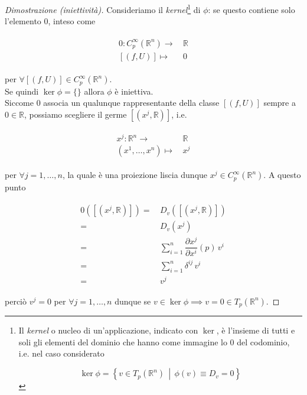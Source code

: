 \begin{proof}[Dimostrazione (iniettività)]
	Consideriamo il \textit{kernel}\footnote{%
	Il \textit{kernel} o nucleo di un'applicazione, indicato con $ \ker $, è l'insieme di tutti e soli gli elementi del dominio che hanno come immagine lo $ 0 $ del codominio, i.e. nel caso considerato
	
	\begin{equation}
		\ker \phi = \left\{ v \in T_{p}(\mathbb{R}^{n}) \, \middle| \, \phi(v) \equiv D_{v} = 0 \right\}
	\end{equation}%
	} di $ \phi $: se questo contiene solo l'elemento $ 0 $, inteso come
	
	\begin{align}
		\begin{split}
			0 : C_{p}^{\infty}(\mathbb{R}^{n}) \to& \, \mathbb{R}\\
			[(f,U)] \mapsto& \, 0
		\end{split}
	\end{align}

	per $ \forall [(f,U)] \in C_{p}^{\infty}(\mathbb{R}^{n}) $.\\
	Se quindi $ \ker \phi = \{\} $ allora $ \phi $ è iniettiva.\\
	Siccome $ 0 $ associa un qualunque rappresentante della classe $ [(f,U)] $ sempre a $ 0 \in \mathbb{R} $, possiamo scegliere il germe $ [(x^{j},\mathbb{R})] $, i.e.
	
	\begin{align}
		\begin{split}
			x^{j} : \mathbb{R}^{n} \to& \, \mathbb{R}\\
			(x^{1},\dots,x^{n}) \mapsto& \, x^{j}
		\end{split}
	\end{align}

	per $ \forall j=1,\dots,n $, la quale è una proiezione liscia dunque $ x^{j} \in C_{p}^{\infty}(\mathbb{R}^{n}) $. A questo punto
	
	\begin{align}
		\begin{split}
			0([(x^{j},\mathbb{R})]) =& \, D_{v} ([(x^{j},\mathbb{R})])\\
			=& \, D_{v} (x^{j})\\
			=& \, \sum_{i=1}^{n} \dfrac{\partial x^{j}}{\partial x^{i}} (p) \, v^{i}\\
			=& \, \sum_{i=1}^{n} \delta^{ij} \, v^{i}\\
			=& \, v^{j}
		\end{split}
	\end{align}

	perciò $ v^{j} = 0 $ per $ \forall j=1,\dots,n $ dunque se $ v \in \ker \phi \implies v = 0 \in T_{p}(\mathbb{R}^{n}) $.
\end{proof}

